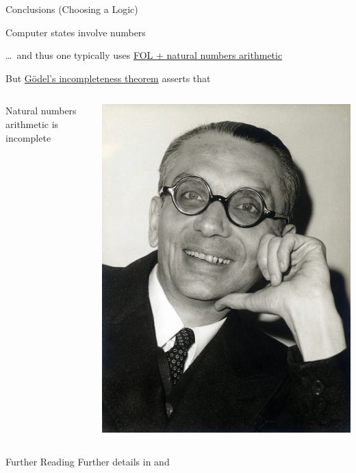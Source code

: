 \documentclass{beamer}
\begin{document}
\begin{frame}{Conclusions (Choosing a Logic)}

        Computer states involve numbers

        \dots \, and thus one typically uses \alert{\underline{FOL + natural
        numbers arithmetic}}

        \bigskip
        \pause
        But \alert{\underline{G\"odel's incompleteness theorem}} asserts that

        \bigskip 
        \begin{minipage}[0.3\textheight]{\textwidth}
                \begin{columns}[c]
                \begin{column}{0.7\textwidth}
                       Natural numbers arithmetic is incomplete 
                \end{column}
                \begin{column}{0.22\textwidth}
                        \includegraphics[scale=0.07]{images/godel.jpg}
                \end{column}
                \end{columns}
       \end{minipage}

       \pause
       \begin{center}
       \end{center}
\end{frame}

\begin{frame}{Further Reading}
        Further details in \cite[Chapter 3]{reynolds98} and \cite[Chapter
        6 and 7]{winskel93}
\end{frame}


\end{document}
